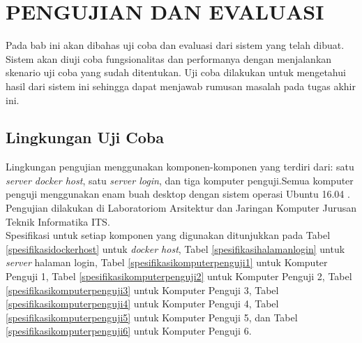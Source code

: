 \chapter{PENGUJIAN DAN EVALUASI}
	Pada bab ini akan dibahas uji coba dan evaluasi dari sistem yang telah dibuat. Sistem akan diuji coba fungsionalitas dan performanya dengan menjalankan skenario uji coba yang sudah ditentukan. Uji coba dilakukan untuk mengetahui hasil dari sistem ini sehingga dapat menjawab rumusan masalah pada tugas akhir ini.    
	
\section{Lingkungan Uji Coba}
	Lingkungan pengujian menggunakan komponen-komponen yang terdiri dari: satu \textit{server docker host}, satu \textit{server login}, dan tiga komputer penguji.Semua komputer penguji menggunakan enam buah desktop dengan sistem operasi Ubuntu 16.04
	. Pengujian dilakukan di Laboratoriom Arsitektur dan Jaringan Komputer Jurusan Teknik Informatika ITS. \\
    \indent Spesifikasi untuk setiap komponen yang digunakan ditunjukkan pada Tabel \ref{spesifikasidockerhost} untuk \textit{docker host}, Tabel \ref{spesifikasihalamanlogin} untuk \textit{server} halaman login, Tabel \ref{spesifikasikomputerpenguji1} untuk Komputer Penguji 1, Tabel \ref{spesifikasikomputerpenguji2} untuk Komputer Penguji 2, Tabel \ref{spesifikasikomputerpenguji3} untuk Komputer Penguji 3, Tabel \ref{spesifikasikomputerpenguji4} untuk Komputer Penguji 4, Tabel \ref{spesifikasikomputerpenguji5} untuk Komputer Penguji 5, dan Tabel \ref{spesifikasikomputerpenguji6} untuk Komputer Penguji 6.
\pagebreak
